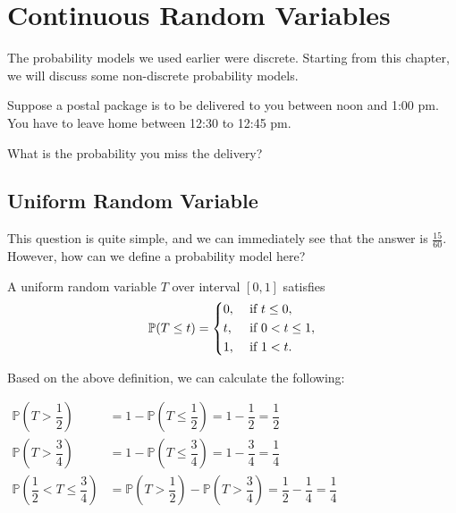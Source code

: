 \chapter{Continuous Random Variables}

The probability models we used earlier were discrete. Starting from this chapter, we will discuss some non-discrete probability models.

Suppose a postal package is to be delivered to you between noon and 1:00 pm. You have to leave home between 12:30 to 12:45 pm.

What is the probability you miss the delivery?

\section{Uniform Random Variable}
This question is quite simple, and we can immediately see that the answer is \(\frac{15}{60}\). However, how can we define a probability model here?

\begin{definition}
    A uniform random variable \(T\) over interval \([0, 1]\) satisfies 
    \[
        \mathbb{P}(T \leq t) = \begin{dcases}
            0, &\text{ if } t \leq 0 ,\\
            t, &\text{ if } 0 < t \leq 1 ,\\
            1, &\text{ if } 1 < t.
        \end{dcases}
    \]
\end{definition}

Based on the above definition, we can calculate the following: 

\(
\begin{aligned}
    \mathbb{P}(T > \dfrac{1}{2}) &= 1 - \mathbb{P}(T \leq \dfrac{1}{2}) = 1 - \dfrac{1}{2} = \dfrac{1}{2} \\
    \mathbb{P}(T > \dfrac{3}{4}) &= 1 - \mathbb{P}(T \leq \dfrac{3}{4}) = 1 - \dfrac{3}{4} = \dfrac{1}{4} \\
    \mathbb{P}(\dfrac{1}{2} < T \leq \dfrac{3}{4}) &= \mathbb{P}(T > \dfrac{1}{2}) - \mathbb{P}(T > \dfrac{3}{4}) = \dfrac{1}{2} - \dfrac{1}{4} = \dfrac{1}{4}
\end{aligned}
\) 

